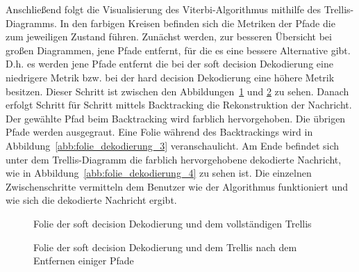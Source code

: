 Anschließend folgt die Visualisierung des Viterbi-Algorithmus mithilfe des Trellis-Diagramms. In den farbigen Kreisen befinden sich die Metriken der Pfade die zum jeweiligen Zustand führen. Zunächst werden, zur besseren Übersicht bei großen Diagrammen, jene Pfade entfernt, für die es eine bessere Alternative gibt. D.h. es werden jene Pfade entfernt die bei der soft decision Dekodierung eine niedrigere Metrik bzw. bei der hard decision Dekodierung eine höhere Metrik besitzen. Dieser Schritt ist zwischen den Abbildungen~\ref{abb:folie_dekodierung_1} und \ref{abb:folie_dekodierung_2} zu sehen. Danach erfolgt Schritt für Schritt mittels Backtracking die Rekonstruktion der Nachricht. Der gewählte Pfad beim Backtracking wird farblich hervorgehoben. Die übrigen Pfade werden ausgegraut. Eine Folie während des Backtrackings wird in Abbildung~\ref{abb:folie_dekodierung_3} veranschaulicht. Am Ende befindet sich unter dem Trellis-Diagramm die farblich hervorgehobene dekodierte Nachricht, wie in Abbildung~\ref{abb:folie_dekodierung_4} zu sehen ist. Die einzelnen Zwischenschritte vermitteln dem Benutzer wie der Algorithmus funktioniert und wie sich die dekodierte Nachricht ergibt.
\begin{figure}[th]
	\centering
	\caption{Folie der soft decision Dekodierung und dem vollständigen Trellis}
	\label{abb:folie_dekodierung_1}
\end{figure}
\begin{figure}[th]
	\centering
	\caption{Folie der soft decision Dekodierung und dem Trellis nach dem Entfernen einiger Pfade}
	\label{abb:folie_dekodierung_2}
\end{figure}

